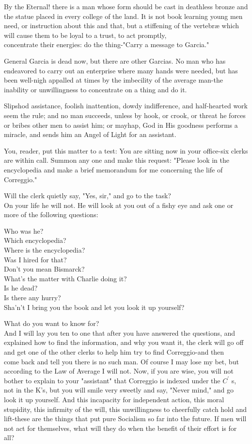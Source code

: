 \documentclass[10pt]{article}
\begin{document}
By the Eternal! there is a man whose form should be cast in deathless bronze and the statue placed in every college of the land. It is not book learning young men need, or instruction about this and that, but a stiffening of the vertebræ which will cause them to be loyal to a trust, to act promptly,\\
concentrate their energies: do the thing-"Carry a message to Garcia."

General Garcia is dead now, but there are other Garcias. No man who has endeavored to carry out an enterprise where many hands were needed, but has been well-nigh appalled at times by the imbecility of the average man-the inability or unwillingness to concentrate on a thing and do it.

Slipshod assistance, foolish inattention, dowdy indifference, and half-hearted work seem the rule; and no man succeeds, unless by hook, or crook, or threat he forces or bribes other men to assist him; or mayhap, God in His goodness performs a miracle, and sends him an Angel of Light for an assistant.

You, reader, put this matter to a test: You are sitting now in your office-six clerks are within call. Summon any one and make this request: "Please look in the encyclopedia and make a brief memorandum for me concerning the life of Correggio."

Will the clerk quietly say, "Yes, sir," and go to the task?\\
On your life he will not. He will look at you out of a fishy eye and ask one or more of the following questions:

Who was he?\\
Which encyclopedia?\\
Where is the encyclopedia?\\
Was I hired for that?\\
Don't you mean Bismarck?\\
What's the matter with Charlie doing it?\\
Is he dead?\\
Is there any hurry?\\
Sha'n't I bring you the book and let you look it up yourself?

What do you want to know for?\\
And I will lay you ten to one that after you have answered the questions, and explained how to find the information, and why you want it, the clerk will go off and get one of the other clerks to help him try to find Correggio-and then\\
come back and tell you there is no such man. Of course I may lose my bet, but according to the Law of Average I will not. Now, if you are wise, you will not bother to explain to your "assistant" that Correggio is indexed under the $C^{\prime}$ s, not in the K's, but you will smile very sweetly and say, "Never mind," and go look it up yourself. And this incapacity for independent action, this moral stupidity, this infirmity of the will, this unwillingness to cheerfully catch hold and lift-these are the things that put pure Socialism so far into the future. If men will not act for themselves, what will they do when the benefit of their effort is for all?
\end{document}
